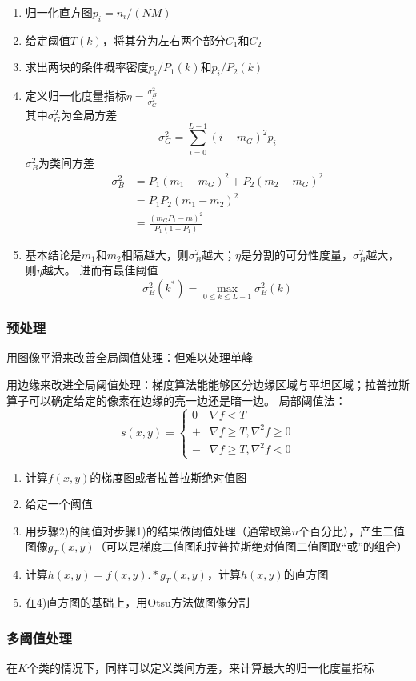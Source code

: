 \begin{enumerate}
\item 归一化直方图$p_i=n_i/(NM)$
\item 给定阈值$T(k)$，将其分为左右两个部分$C_1$和$C_2$
\item 求出两块的条件概率密度$p_i/P_1(k)$和$p_i/P_2(k)$
\item 定义归一化度量指标$\eta=\frac{\sigma_B^2}{\sigma_G^2}$\\
其中$\sigma_G^2$为全局方差
\[\sigma_G^2=\sum_{i=0}^{L-1}(i-m_G)^2p_i\]
$\sigma_B^2$为类间方差
\[\begin{aligned}
\sigma_B^2 &= P_1(m_1-m_G)^2+P_2(m_2-m_G)^2\\
&=P_1P_2(m_1-m_2)^2\\
&=\frac{(m_G P_1-m)^2}{P_1(1-P_1)}
\end{aligned}\]
\item 基本结论是$m_1$和$m_2$相隔越大，则$\sigma_B^2$越大；$\eta$是分割的可分性度量，$\sigma_B^2$越大，则$\eta$越大。
进而有最佳阈值
\[\sigma_B^2(k^*)=\max_{0\leq k\leq L-1}\sigma_B^2(k)\]
\end{enumerate}

\subsubsection{预处理}
用图像平滑来改善全局阈值处理：但难以处理单峰

用边缘来改进全局阈值处理：梯度算法能能够区分边缘区域与平坦区域；拉普拉斯算子可以确定给定的像素在边缘的亮一边还是暗一边。
局部阈值法：
\[s(x,y)=\begin{cases}
0 & \nabla f<T\\
+ & \nabla f\geq T, \nabla^2 f\geq 0\\
- & \nabla f\geq T, \nabla^2 f< 0
\end{cases}\]
\begin{enumerate}
	\item 计算$f(x,y)$的梯度图或者拉普拉斯绝对值图
	\item 给定一个阈值
	\item 用步骤2)的阈值对步骤1)的结果做阈值处理（通常取第$n$个百分比），产生二值图像$g_T(x,y)$（可以是梯度二值图和拉普拉斯绝对值图二值图取“或”的组合）
	\item 计算$h(x,y)=f(x,y).*g_T(x,y)$，计算$h(x,y)$的直方图
	\item 在4)直方图的基础上，用Otsu方法做图像分割
\end{enumerate}

\subsubsection{多阈值处理}
在$K$个类的情况下，同样可以定义类间方差，来计算最大的归一化度量指标

